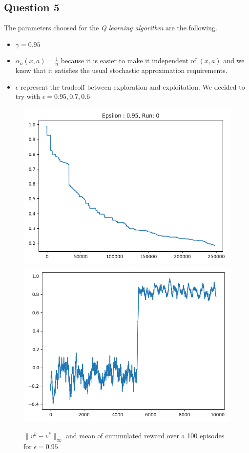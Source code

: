 \documentclass[10pt,a4paper]{article}
\begin{document}
\subsection{Question 5}
The parameters choosed for the \textit{Q learning algorithm} are the following.
\begin{itemize}
\item $\gamma = 0.95$
\item $\alpha_n(x,a) = \frac{1}{n}$ because it is easier to make it independent of $(x,a)$ and we know that it satisfies the usual stochastic approximation
requirements.
\item $\epsilon$ represent the tradeoff between exploration and exploitation. We decided to try with $\epsilon = 0.95, 0.7, 0.6$
\end{itemize}
\begin{figure}[h]
\centering
\caption{$\parallel v^k - v^* \parallel_{\infty}$ and mean of cummulated reward over a 100 episodes for $\epsilon=0.95$}
\includegraphics[scale=.35]{q5_v.png}
\includegraphics[scale=.35]{q5_r.png}
\end{figure}
\end{document}

